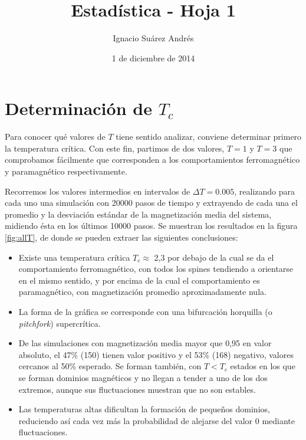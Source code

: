 \documentclass{scrartcl}
\title{Estadística - Hoja 1}
\author{Ignacio Suárez Andrés}
\date{1 de diciembre de 2014}
\begin{document}
\maketitle

\section{Determinación de $T_c$}
Para conocer qué valores de $T$ tiene sentido analizar, conviene determinar primero la temperatura crítica. Con este fin, partimos de dos valores, $T=1$ y $T=3$ que comprobamos fácilmente que corresponden a los comportamientos ferromagnético y paramagnético respectivamente.\par
Recorremos los valores intermedios en intervalos de $\Delta T = 0.005$, realizando para cada uno una simulación con 20000 pasos de tiempo y extrayendo de cada una el promedio y la desviación estándar de la magnetización media del sistema, midiendo ésta en los últimos 10000 pasos. Se muestran los resultados en la figura \ref{fig:allT}, de donde se pueden extraer las siguientes conclusiones:\par
\begin{itemize}
\item Existe una temperatura crítica $T_c \approx$ 2,3 por debajo de la cual se da el comportamiento ferromagnético, con todos los spines tendiendo a orientarse en el mismo sentido, y por encima de la cual el comportamiento es paramagnético, con magnetización promedio aproximadamente nula.
\item La forma de la gráfica se corresponde con una bifurcación horquilla (o \textit{pitchfork}) supercrítica.
\item De las simulaciones con magnetización media mayor que 0,95 en valor absoluto, el 47\% (150) tienen valor positivo y el 53\% (168) negativo, valores cercanos al 50\% esperado. Se forman también, con $T<T_c$ estados en los que se forman dominios magnéticos y no llegan a tender a uno de los dos extremos, aunque sus fluctuaciones muestran que no son estables.
\item Las temperaturas altas dificultan la formación de pequeños dominios, reduciendo así cada vez más la probabilidad de alejarse del valor 0 mediante fluctuaciones.
\end{itemize}
\end{document}
